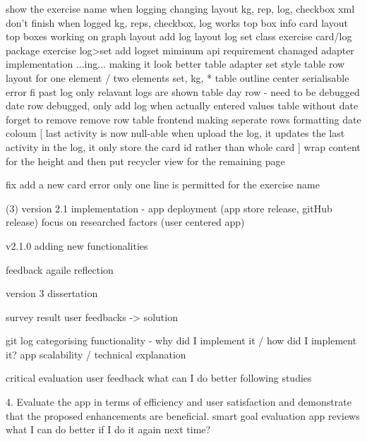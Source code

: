 show the exercise name when logging
changing layout
kg, rep, log, checkbox xml
don't finish when logged
kg, reps, checkbox, log works
top box
info card layout
top boxes
working on graph layout
add log layout
log set class
exercise card/log package
exercise log>set
add logset
miminum api requirement chanaged
adapter implementation ...ing...
making it look better
table adapter
set style
table row layout for one element / two elements
set, kg, *
table outline
center
serialisable error fi
past log
only relavant logs are shown
table day row - need to be debugged
date row debugged, only add log when actually entered values
table without date
forget to remove remove row
table frontend
making seperate rows
formatting date coloum
[
    last activity is now null-able
    when upload the log, it updates the last activity
    in the log, it only store the card id rather than whole card
]
wrap content for the height and then put recycler view for the remaining page


fix add a new card error
only one line is permitted for the exercise name






(3) version 2.1 implementation - app deployment (app store release, gitHub release)
focus on researched factors (user centered app)


\version v2.1.0 {
    adding new functionalities
} 














feedback agaile reflection


version 3 dissertation

survey result
user feedbacks -> solution


git log categorising
functionality - why did I implement it / how did I implement it?
app scalability / technical explanation



critical evaluation
user feedback
what can I do better
following studies

4. Evaluate the app in terms of efficiency and user satisfaction and demonstrate that the proposed enhancements are beneficial.
	smart goal evaluation
	app reviews
	what I can do better if I do it again next time?